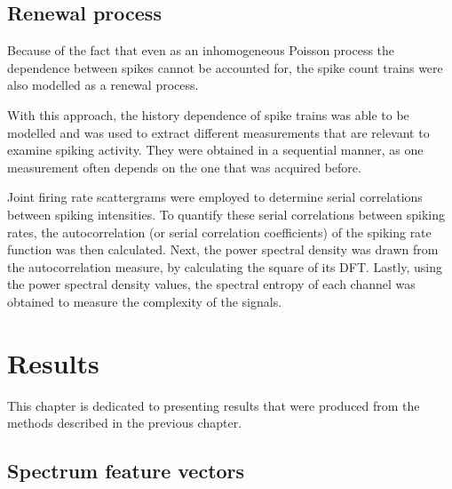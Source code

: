 \documentclass{kththesis}
\begin{document}
\section{Renewal process}\label{RP Method}

Because of the fact that even as an inhomogeneous Poisson process the dependence between spikes cannot be accounted for, the spike count trains were also modelled as a renewal process.

With this approach, the history dependence of spike trains was able to be modelled and was used to extract different measurements that are relevant to examine spiking activity. 
They were obtained in a sequential manner, as one measurement often depends on the one that was acquired before.

Joint firing rate scattergrams were employed to determine serial correlations between spiking intensities. 
To quantify these serial correlations between spiking rates, the autocorrelation (or serial correlation coefficients) of the spiking rate function was then calculated. 
Next, the power spectral density was drawn from the autocorrelation measure, by calculating the square of its DFT. 
Lastly, using the power spectral density values, the spectral entropy of each channel was obtained to measure the complexity of the signals.

\newpage
\chapter{Results}

This chapter is dedicated to presenting results that were produced from the methods described in the previous chapter.

\section{Spectrum feature vectors}\label{SFV Results}
\end{document}
